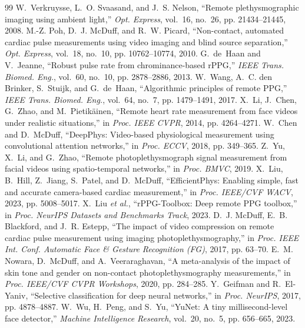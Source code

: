 \documentclass[conference]{IEEEtran}
\begin{document}
\begin{thebibliography}{99}
 W.~Verkruysse, L.~O. Svaasand, and J.~S. Nelson, ``Remote plethysmographic imaging using ambient light,'' \textit{Opt. Express}, vol.~16, no.~26, pp. 21434--21445, 2008.
 M.-Z. Poh, D.~J. McDuff, and R.~W. Picard, ``Non-contact, automated cardiac pulse measurements using video imaging and blind source separation,'' \textit{Opt. Express}, vol.~18, no.~10, pp. 10762--10774, 2010.
 G.~de~Haan and V.~Jeanne, ``Robust pulse rate from chrominance-based rPPG,'' \textit{IEEE Trans. Biomed. Eng.}, vol.~60, no.~10, pp. 2878--2886, 2013.
 W.~Wang, A.~C. den Brinker, S.~Stuijk, and G.~de~Haan, ``Algorithmic principles of remote PPG,'' \textit{IEEE Trans. Biomed. Eng.}, vol.~64, no.~7, pp. 1479--1491, 2017.
 X.~Li, J.~Chen, G.~Zhao, and M.~Pietik\"ainen, ``Remote heart rate measurement from face videos under realistic situations,'' in \textit{Proc. IEEE CVPR}, 2014, pp. 4264--4271.
 W.~Chen and D.~McDuff, ``DeepPhys: Video-based physiological measurement using convolutional attention networks,'' in \textit{Proc. ECCV}, 2018, pp. 349--365.
 Z.~Yu, X.~Li, and G.~Zhao, ``Remote photoplethysmograph signal measurement from facial videos using spatio-temporal networks,'' in \textit{Proc. BMVC}, 2019.
 X.~Liu, B.~Hill, Z.~Jiang, S.~Patel, and D.~McDuff, ``EfficientPhys: Enabling simple, fast and accurate camera-based cardiac measurement,'' in \textit{Proc. IEEE/CVF WACV}, 2023, pp. 5008--5017.
 X.~Liu \textit{et al.}, ``rPPG-Toolbox: Deep remote PPG toolbox,'' in \textit{Proc. NeurIPS Datasets and Benchmarks Track}, 2023.
 D.~J. McDuff, E.~B. Blackford, and J.~R. Estepp, ``The impact of video compression on remote cardiac pulse measurement using imaging photoplethysmography,'' in \textit{Proc. IEEE Int. Conf. Automatic Face \& Gesture Recognition (FG)}, 2017, pp. 63--70.
 E.~M. Nowara, D.~McDuff, and A.~Veeraraghavan, ``A meta-analysis of the impact of skin tone and gender on non-contact photoplethysmography measurements,'' in \textit{Proc. IEEE/CVF CVPR Workshops}, 2020, pp. 284--285.
 Y.~Geifman and R.~El-Yaniv, ``Selective classification for deep neural networks,'' in \textit{Proc. NeurIPS}, 2017, pp. 4878--4887.
 W.~Wu, H.~Peng, and S.~Yu, ``YuNet: A tiny millisecond-level face detector,'' \textit{Machine Intelligence Research}, vol.~20, no.~5, pp. 656--665, 2023.

\end{thebibliography}
\end{document}
